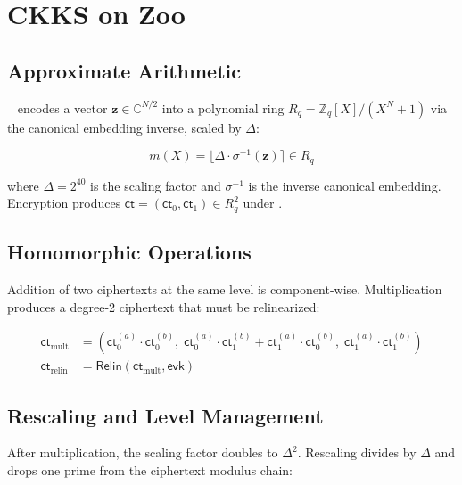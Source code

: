 \section{CKKS on Zoo}

\label{sec:ckks}

\subsection{Approximate Arithmetic}

\CKKS{}~\cite{cheon2017ckks} encodes a vector $\mathbf{z} \in \mathbb{C}^{N/2}$ into a polynomial ring $R_q = \mathbb{Z}_q[X]/(X^N+1)$ via the canonical embedding inverse, scaled by $\Delta$:

\begin{equation}
  m(X) = \lfloor \Delta \cdot \sigma^{-1}(\mathbf{z}) \rceil \in R_q
\end{equation}

\noindent where $\Delta = 2^{40}$ is the scaling factor and $\sigma^{-1}$ is the inverse canonical embedding. Encryption produces $\mathsf{ct} = (\mathsf{ct}_0, \mathsf{ct}_1) \in R_q^2$ under \RLWE{}.

\subsection{Homomorphic Operations}

Addition of two \CKKS{} ciphertexts at the same level is component-wise. Multiplication produces a degree-2 ciphertext that must be relinearized:

\begin{align}
  \mathsf{ct}_{\mathrm{mult}} &= (\mathsf{ct}_0^{(a)} \cdot \mathsf{ct}_0^{(b)},\; \mathsf{ct}_0^{(a)} \cdot \mathsf{ct}_1^{(b)} + \mathsf{ct}_1^{(a)} \cdot \mathsf{ct}_0^{(b)},\; \mathsf{ct}_1^{(a)} \cdot \mathsf{ct}_1^{(b)}) \\
  \mathsf{ct}_{\mathrm{relin}} &= \mathsf{Relin}(\mathsf{ct}_{\mathrm{mult}}, \mathsf{evk})
\end{align}

\subsection{Rescaling and Level Management}

After multiplication, the scaling factor doubles to $\Delta^2$. Rescaling divides by $\Delta$ and drops one prime from the ciphertext modulus chain:


